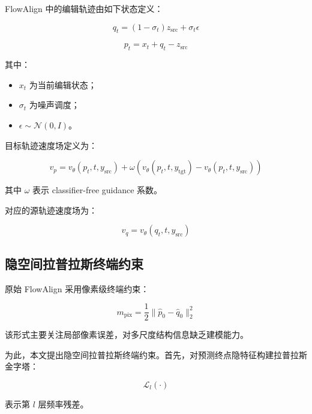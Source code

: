 \documentclass[11pt,a4paper]{ctexart}
\numberwithin{equation}{section}
\begin{document}
FlowAlign 中的编辑轨迹由如下状态定义：

\begin{equation}
q_t = (1-\sigma_t) z_{\text{src}} + \sigma_t \epsilon
\end{equation}

\begin{equation}
p_t = x_t + q_t - z_{\text{src}}
\end{equation}

其中：

\begin{itemize}
    \item $x_t$ 为当前编辑状态；
    \item $\sigma_t$ 为噪声调度；
    \item $\epsilon \sim \mathcal{N}(0, I)$。
\end{itemize}

目标轨迹速度场定义为：

\begin{equation}
v_p =
v_{\theta}(p_t, t, y_{\text{src}})
+
\omega
\left(
v_{\theta}(p_t, t, y_{\text{tgt}})
-
v_{\theta}(p_t, t, y_{\text{src}})
\right)
\end{equation}

其中 $\omega$ 表示 classifier-free guidance 系数。

对应的源轨迹速度场为：

\begin{equation}
v_q = v_{\theta}(q_t, t, y_{\text{src}})
\end{equation}

\subsection{隐空间拉普拉斯终端约束}

原始 FlowAlign 采用像素级终端约束：

\begin{equation}
m_{\text{pix}}
=
\frac{1}{2}
\|
\hat{p}_0 - \hat{q}_0
\|_2^2
\end{equation}

该形式主要关注局部像素误差，对多尺度结构信息缺乏建模能力。

为此，本文提出隐空间拉普拉斯终端约束。首先，对预测终点隐特征构建拉普拉斯金字塔：

\begin{equation}
\mathcal{L}_l(\cdot)
\end{equation}

表示第 $l$ 层频率残差。
\end{document}
